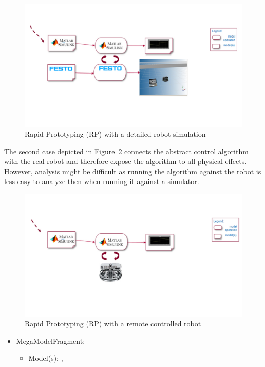 \begin{figure}[!htb]
\centering
\includegraphics[scale=0.4]{figures/mm-hpi5.pdf}
\caption{Rapid Prototyping (RP) with a detailed robot simulation}
\label{fig:MMFig5}
\end{figure}

The second case depicted in Figure~\ref{fig:MMFig6} connects the abstract control algorithm with the real robot and therefore expose the algorithm to all physical effects. However, analysis might be difficult as running the algorithm against the robot is less easy to analyze then when running it against a simulator.

\begin{figure}[!htb]
\centering
\includegraphics[scale=0.33]{figures/mm-hpi6.pdf}
\caption{Rapid Prototyping (RP) with a remote controlled robot}
\label{fig:MMFig6}
\end{figure}

%
%

\begin{itemize}
    \item MegaModelFragment: \CPSLabRPaMMF
    \begin{itemize}
        \item Model(s): \CPSLabControlModel, \CPSLabRobotModel
    \end{itemize}
\end{itemize}

